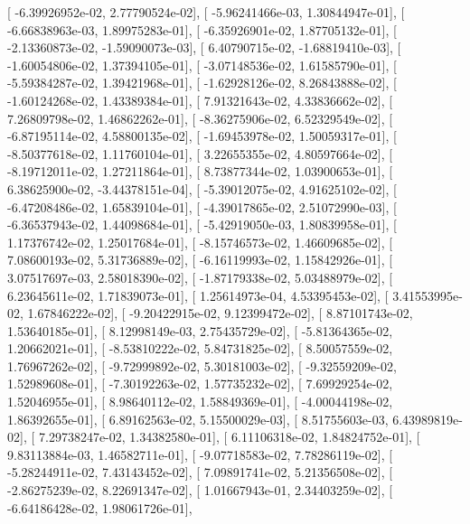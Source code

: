 \documentclass{article}
\begin{document}
       [ -6.39926952e-02,   2.77790524e-02],
       [ -5.96241466e-03,   1.30844947e-01],
       [ -6.66838963e-03,   1.89975283e-01],
       [ -6.35926901e-02,   1.87705132e-01],
       [ -2.13360873e-02,  -1.59090073e-03],
       [  6.40790715e-02,  -1.68819410e-03],
       [ -1.60054806e-02,   1.37394105e-01],
       [ -3.07148536e-02,   1.61585790e-01],
       [ -5.59384287e-02,   1.39421968e-01],
       [ -1.62928126e-02,   8.26843888e-02],
       [ -1.60124268e-02,   1.43389384e-01],
       [  7.91321643e-02,   4.33836662e-02],
       [  7.26809798e-02,   1.46862262e-01],
       [ -8.36275906e-02,   6.52329549e-02],
       [ -6.87195114e-02,   4.58800135e-02],
       [ -1.69453978e-02,   1.50059317e-01],
       [ -8.50377618e-02,   1.11760104e-01],
       [  3.22655355e-02,   4.80597664e-02],
       [ -8.19712011e-02,   1.27211864e-01],
       [  8.73877344e-02,   1.03900653e-01],
       [  6.38625900e-02,  -3.44378151e-04],
       [ -5.39012075e-02,   4.91625102e-02],
       [ -6.47208486e-02,   1.65839104e-01],
       [ -4.39017865e-02,   2.51072990e-03],
       [ -6.36537943e-02,   1.44098684e-01],
       [ -5.42919050e-03,   1.80839958e-01],
       [  1.17376742e-02,   1.25017684e-01],
       [ -8.15746573e-02,   1.46609685e-02],
       [  7.08600193e-02,   5.31736889e-02],
       [ -6.16119993e-02,   1.15842926e-01],
       [  3.07517697e-03,   2.58018390e-02],
       [ -1.87179338e-02,   5.03488979e-02],
       [  6.23645611e-02,   1.71839073e-01],
       [  1.25614973e-04,   4.53395453e-02],
       [  3.41553995e-02,   1.67846222e-02],
       [ -9.20422915e-02,   9.12399472e-02],
       [  8.87101743e-02,   1.53640185e-01],
       [  8.12998149e-03,   2.75435729e-02],
       [ -5.81364365e-02,   1.20662021e-01],
       [ -8.53810222e-02,   5.84731825e-02],
       [  8.50057559e-02,   1.76967262e-02],
       [ -9.72999892e-02,   5.30181003e-02],
       [ -9.32559209e-02,   1.52989608e-01],
       [ -7.30192263e-02,   1.57735232e-02],
       [  7.69929254e-02,   1.52046955e-01],
       [  8.98640112e-02,   1.58849369e-01],
       [ -4.00044198e-02,   1.86392655e-01],
       [  6.89162563e-02,   5.15500029e-03],
       [  8.51755603e-03,   6.43989819e-02],
       [  7.29738247e-02,   1.34382580e-01],
       [  6.11106318e-02,   1.84824752e-01],
       [  9.83113884e-03,   1.46582711e-01],
       [ -9.07718583e-02,   7.78286119e-02],
       [ -5.28244911e-02,   7.43143452e-02],
       [  7.09891741e-02,   5.21356508e-02],
       [ -2.86275239e-02,   8.22691347e-02],
       [  1.01667943e-01,   2.34403259e-02],
       [ -6.64186428e-02,   1.98061726e-01],
\end{document}
